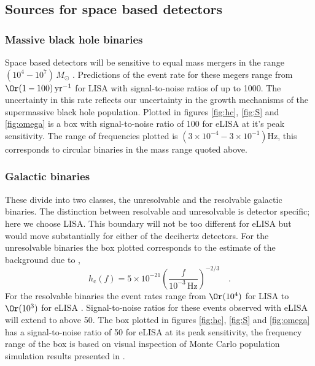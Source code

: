 \documentclass[fleqn,12pt]{iopart}
\newcommand{\Msun}{\ensuremath{M_{ \odot }}}
\newcommand{\sub}[1]{\ensuremath{_\mathrm{#1}}}
\begin{document}
\subsection{Sources for space based detectors}

\subsubsection{Massive black hole binaries}
Space based detectors will be sensitive to equal mass mergers in the range $(10^{4}-10^{7})\,\Msun$ \citep{Gair2012a}. Predictions of the event rate for these megers range from $\Or(1-100)\,\textrm{yr}^{-1}$ for LISA with signal-to-noise ratios of up to 1000. The uncertainty in this rate reflects our uncertainty in the growth mechanisms of the supermassive black hole population. Plotted in figures \ref{fig:hc}, \ref{fig:S} and \ref{fig:omega} is a box with signal-to-noise ratio of 100 for eLISA at it's peak sensitivity. The range of frequencies plotted is $(3\times 10^{-4}-3\times 10^{-1})\textrm{Hz}$, this corresponds to circular binaries in the mass range quoted above.

\subsubsection{Galactic binaries} \label{sec:GB}
These divide into two classes, the unresolvable and the resolvable galactic binaries. The distinction between resolvable and unresolvable is detector specific; here we choose LISA. This boundary will not be too different for eLISA but would move substantially for either of the decihertz detectors. For the unresolvable binaries the box plotted corresponds to the estimate of the background due to \citet{Nelemans2001},
\begin{equation} h\sub{c}(f)= 5\times 10^{-21} \left(\frac{f}{10^{-3}\,\textrm{Hz}}\right)^{-2/3} \quad . \end{equation}
For the resolvable binaries the event rates range from $\Or(10^{4})$ for LISA to $\Or(10^{3})$ for eLISA \citep{Gair2012a}. Signal-to-noise ratios for these events observed with eLISA will extend to above 50. The box plotted in figures \ref{fig:hc}, \ref{fig:S} and \ref{fig:omega} has a signal-to-noise ratio of 50 for eLISA at its peak sensitivity, the frequency range of the box is based on visual inspection of Monte Carlo population simulation results presented in \citet{Amaro-Seoane2012}.
\end{document}
